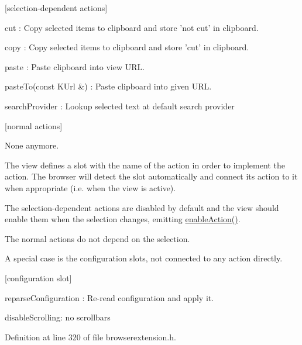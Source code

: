 \mbox{[}selection-\/dependent actions\mbox{]} \begin{DoxyItemize}
\item {\ttfamily cut} \+: Copy selected items to clipboard and store 'not cut' in clipboard. \item {\ttfamily copy} \+: Copy selected items to clipboard and store 'cut' in clipboard. \item {\ttfamily paste} \+: Paste clipboard into view U\+R\+L. \item {\ttfamily paste\+To(const K\+Url \&)} \+: Paste clipboard into given U\+R\+L. \item {\ttfamily search\+Provider} \+: Lookup selected text at default search provider\end{DoxyItemize}
\mbox{[}normal actions\mbox{]} \begin{DoxyItemize}
\item None anymore.\end{DoxyItemize}
The view defines a slot with the name of the action in order to implement the action. The browser will detect the slot automatically and connect its action to it when appropriate (i.\+e. when the view is active).

The selection-\/dependent actions are disabled by default and the view should enable them when the selection changes, emitting \hyperlink{classKParts_1_1BrowserExtension_a3252f2adebd103519ee15e57037c7386}{enable\+Action()}.

The normal actions do not depend on the selection.

A special case is the configuration slots, not connected to any action directly.

\mbox{[}configuration slot\mbox{]} \begin{DoxyItemize}
\item {\ttfamily reparse\+Configuration} \+: Re-\/read configuration and apply it. \item {\ttfamily disable\+Scrolling\+:} no scrollbars \end{DoxyItemize}


Definition at line 320 of file browserextension.\+h.



